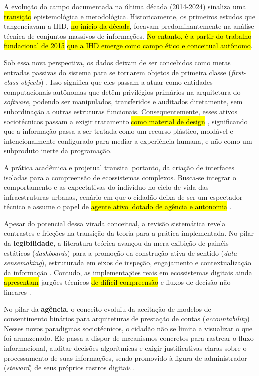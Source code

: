 \documentclass[12pt]{article}
\newcommand{\hlcite}[1]{\colorbox{yellow}{\cite{#1}}} %
\begin{document}
{{     A evolução do campo documentada na última década (2014-2024) sinaliza uma \hl{transição} epistemológica e metodológica. Historicamente, os primeiros estudos que tangenciavam a IHD, \hl{no início da década}, focavam predominantemente na análise técnica de conjuntos massivos de informações\hlcite{Parviainen2016, Meireles2016, Hornung2015}. \hl{No entanto, é a partir do trabalho fundacional de 2015} \cite{mortier2015humandatainteractionhumanface} \hl{que a IHD emerge como campo ético e conceitual autônomo}.

    Sob essa nova perspectiva, os dados deixam de ser concebidos como meras entradas passivas do sistema para se tornarem objetos de primeira classe (\textit{first-class objects}) \hlcite{Crabtree2016}. Isso significa que eles passam a atuar como entidades computacionais autônomas que detêm privilégios primários na arquitetura do \textit{software}, podendo ser manipulados, transferidos e auditados diretamente, sem subordinação a outras estruturas funcionais. Consequentemente, esses ativos sociotécnicos passam a exigir tratamento \hl{como material de design} \cite{seidelin2020foregrounding}, significando que a informação passa a ser tratada como um recurso plástico, moldável e intencionalmente configurado para mediar a experiência humana, e não como um subproduto inerte da programação. 

    A prática acadêmica e projetual transita, portanto, da criação de interfaces isoladas para a compreensão de ecossistemas complexos. Busca-se integrar o comportamento e as expectativas do indivíduo no ciclo de vida das infraestruturas urbanas, cenário em que o cidadão deixa de ser um espectador técnico e assume o papel de \hl{agente ativo, dotado de agência e autonomia} \cite{Sailaja2021Designing, bavaresco2019technological}.

    Apesar do potencial dessa virada conceitual, a revisão sistemática revela contrastes e fricções na transição da teoria para a prática implementada. No pilar da \textbf{legibilidade}, a literatura teórica avançou da mera exibição de painéis estáticos (\textit{dashboards}) para a promoção da construção ativa de sentido (\textit{data sensemaking}), estruturada em eixos de inspeção, engajamento e contextualização da informação \hlcite{Koesten2021}. Contudo, as implementações reais em ecossistemas digitais ainda \hl{apresentam} jargões técnicos \hl{de difícil compreensão} e fluxos de decisão não lineares \cite{Sailaja2021}.

    No pilar da \textbf{agência}, o conceito evoluiu da aceitação de modelos de consentimento binários para arquiteturas de prestação de contas (\textit{accountability}) \cite{janecek2018ownership}. Nesses novos paradigmas sociotécnicos, o cidadão não se limita a visualizar o que foi armazenado. Ele passa a dispor de mecanismos concretos para rastrear o fluxo informacional, auditar decisões algorítmicas e exigir justificativas claras sobre o processamento de suas informações, sendo promovido à figura de administrador (\textit{steward}) de seus próprios rastros digitais \cite{angelopoulos2021stewardship}. 

}}
\end{document}
